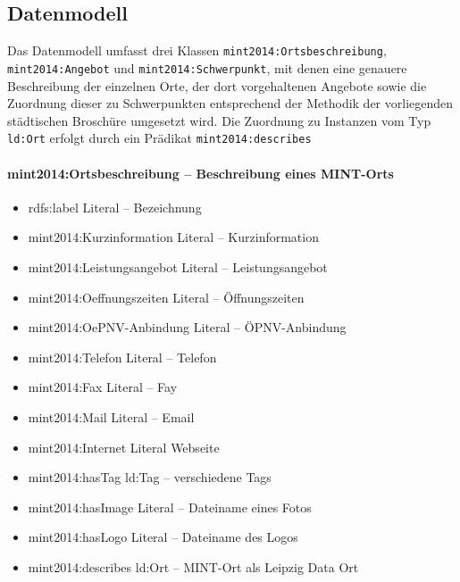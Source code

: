 \documentclass[a4paper,11pt]{article}
\begin{document}
\subsection{Datenmodell}

Das Datenmodell umfasst drei Klassen \texttt{mint2014:Ortsbeschreibung},
\texttt{mint2014:Angebot} und \texttt{mint2014:Schwerpunkt}, mit denen eine
genauere Beschreibung der einzelnen Orte, der dort vorgehaltenen Angebote sowie
die Zuordnung dieser zu Schwerpunkten entsprechend der Methodik der
vorliegenden städtischen Broschüre umgesetzt wird.  Die Zuordnung zu Instanzen
vom Typ \texttt{ld:Ort} erfolgt durch ein Prädikat \texttt{mint2014:describes}

\paragraph{mint2014:Ortsbeschreibung – Beschreibung eines MINT-Orts}
\begin{itemize}\itemsep0pt
\item rdfs:label Literal – Bezeichnung
\item  mint2014:Kurzinformation Literal – Kurzinformation
\item  mint2014:Leistungsangebot Literal – Leistungsangebot
\item  mint2014:Oeffnungszeiten Literal – Öffnungszeiten
\item  mint2014:OePNV-Anbindung Literal – ÖPNV-Anbindung
\item  mint2014:Telefon Literal – Telefon
\item  mint2014:Fax Literal – Fay
\item  mint2014:Mail Literal – Email
\item  mint2014:Internet Literal  Webseite
\item  mint2014:hasTag ld:Tag – verschiedene Tags
\item  mint2014:hasImage Literal – Dateiname eines Fotos
\item  mint2014:hasLogo Literal – Dateiname des Logos
\item  mint2014:describes ld:Ort – MINT-Ort als Leipzig Data Ort
\end{itemize}
\end{document}
